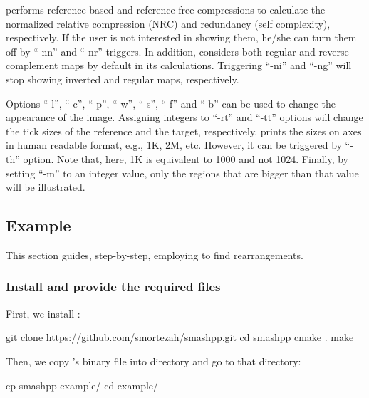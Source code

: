 \smashpp performs reference-based and reference-free compressions to calculate the normalized relative compression (NRC) and redundancy (self complexity), respectively. If the user is not interested in showing them, he/she can turn them off by ``-nn'' and ``-nr'' triggers. In addition, \smashpp considers both regular and reverse complement maps by default in its calculations. Triggering ``-ni'' and ``-ng'' will stop showing inverted and regular maps, respectively.

Options ``-l'', ``-c'', ``-p'', ``-w'', ``-s'', ``-f'' and ``-b'' can be used to change the appearance of the image. Assigning integers to ``-rt'' and ``-tt'' options will change the tick sizes of the reference and the target, respectively. \smashpp prints the sizes on axes in human readable format, e.g., 1K, 2M, etc. However, it can be triggered by ``-th'' option. Note that, here, 1K is equivalent to 1000 and not 1024. Finally, by setting ``-m'' to an integer value, only the regions that are bigger than that value will be illustrated.

\subsection{Example}
This section guides, step-by-step, employing \smashpp to find rearrangements.

\subsubsection*{Install \smashpp and provide the required files}
First, we install \smashpp:
\begin{code}[style=bash]
git clone https://github.com/smortezah/smashpp.git
cd smashpp
cmake .
make
\end{code}
Then, we copy \smashpp's binary file into  directory and go to that directory:
\begin{code}[style=bash]
cp smashpp example/
cd example/
\end{code}